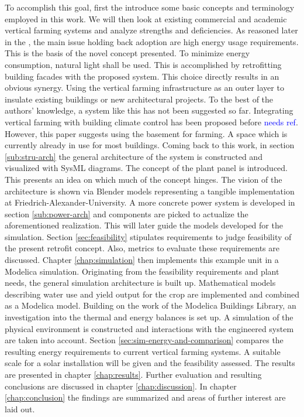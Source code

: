 To accomplish this goal, first the  introduce some basic concepts and terminology employed in this work.
We will then look at existing commercial and academic vertical farming systems and analyze strengths and deficiencies.
As reasoned later in the , the main issue holding back adoption are high energy usage requirements.
This is the basis of the novel concept presented.
To minimize energy consumption, natural light shall be used.
This is accomplished by retrofitting building facades with the proposed system.
This choice directly results in an obvious synergy.
Using the vertical farming infrastructure as an outer layer to insulate existing buildings or new architectural projects.
To the best of the authors' knowledge, a system like this has not been suggested so far.
Integrating vertical farming with building climate control has been proposed before \textcolor{Blue}{needs ref}.
However, this paper suggests using the basement for farming.
A space which is currently already in use for most buildings.
Coming back to this work, in section \ref{sub:stru-arch} the general architecture of the system is constructed and visualized with SysML diagrams.
The concept of the plant panel is introduced.
This presents an idea on which much of the concept hinges.
The vision of the architecture is shown via Blender models representing a tangible implementation at Friedrich-Alexander-University.
A more concrete power system is developed in section \ref{sub:power-arch} and components are picked to actualize the aforementioned realization.
This will later guide the models developed for the simulation.
Section \ref{sec:feasibility} stipulates requirements to judge feasibility of the present retrofit concept.
Also, metrics to evaluate these requirements are discussed.
Chapter \ref{chap:simulation} then implements this example unit in a Modelica simulation.
Originating from the feasibility requirements and plant needs, the general simulation architecture is built up.
Mathematical models describing water use and yield output for the crop are implemented and combined as a Modelica model.
Building on the work of the Modelica Buildings Library, an investigation into the thermal and energy balances is set up.
A simulation of the physical environment is constructed and interactions with the engineered system are taken into account.
Section \ref{sec:sim-energy-and-comparison} compares the resulting energy requirements to current vertical farming systems.
A suitable scale for a solar installation will be given and the feasibility assessed.
The results are presented in chapter \ref{chap:results}.
Further evaluation and resulting conclusions are discussed in chapter \ref{chap:discussion}.
In chapter \ref{chap:conclusion} the findings are summarized and areas of further interest are laid out.



